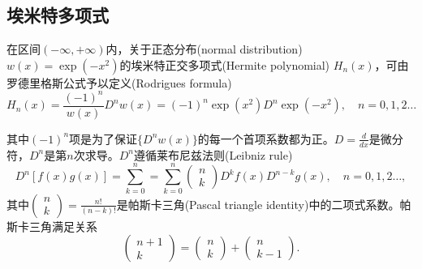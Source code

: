 \begin{subappendices}
\subsection{埃米特多项式}
\label{sec:poly-hermite}
\begin{theorem}[埃米特多项式的罗德里格斯公式]
在区间$(-\infty,+\infty)$内，关于正态分布(normal distribution) $w(x)=\exp(-x^2)$的埃米特正交多项式(Hermite polynomial) $H_n(x)$，可由罗德里格斯公式予以定义(Rodrigues formula)
\begin{equation}
  \label{eq:poly-hermite-rodrigues-formula}
  H_n(x) = \frac{(-1)^n}{w(x)} D^n w(x) = (-1)^n \exp(x^2) D^n \exp(-x^2), \quad n=0,1,2\ldots
\end{equation}
\end{theorem}
其中$(-1)^n$项是为了保证$\{D^n w(x)\}$的每一个首项系数都为正。$D=\frac{d}{d x}$是微分符，$D^n$是第$n$次求导。$D^n$遵循莱布尼兹法则(Leibniz rule)
\begin{equation}
  \label{eq:poly-leibniz-rule}
  D^n \left[f(x) g(x)\right] = \sum_{k=0}^{n} = \sum_{k=0}^{n} \begin{pmatrix} n \\ k \end{pmatrix} D^k f(x) D^{n-k} g(x), \quad n=0,1,2 \ldots,
\end{equation}
其中$\begin{pmatrix} n \\ k \end{pmatrix} = \frac{n!}{(n-k)!}$是帕斯卡三角(Pascal triangle identity)中的二项式系数。帕斯卡三角满足关系
\begin{equation*}
  \begin{pmatrix}
    n+1 \\ k
  \end{pmatrix} = \begin{pmatrix}
    n \\ k
  \end{pmatrix} +
  \begin{pmatrix}
    n \\ k-1
  \end{pmatrix}.
\end{equation*}


\end{subappendices}
